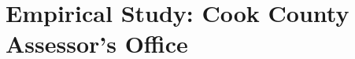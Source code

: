 \documentclass[12pt]{article}
\theoremstyle{plain}
\theoremstyle{definition}
\newcommand{\1}{\mathbf{1}}
\begin{document}











\section{Empirical Study: Cook County Assessor's Office}
\label{sec:empirical}
\end{document}
